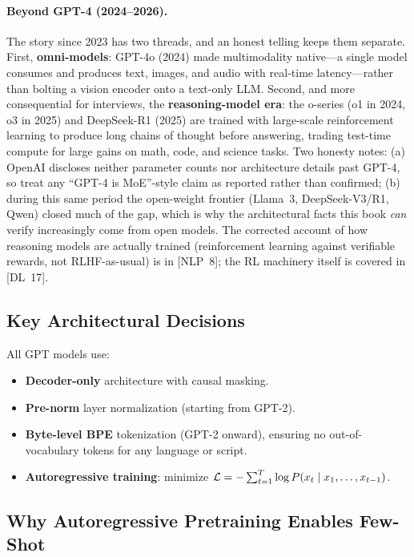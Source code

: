 \paragraph{Beyond GPT-4 (2024--2026).}
The story since 2023 has two threads, and an honest telling keeps them
separate.  First, \textbf{omni-models}: GPT-4o (2024) made multimodality
native---a single model consumes and produces text, images, and audio with
real-time latency---rather than bolting a vision encoder onto a text-only
LLM.  Second, and more consequential for interviews, the
\textbf{reasoning-model era}: the o-series (o1 in 2024, o3 in 2025) and
DeepSeek-R1 (2025) are trained with large-scale reinforcement learning to
produce long chains of thought before answering, trading test-time compute
for large gains on math, code, and science tasks.  Two honesty notes: (a)
OpenAI discloses neither parameter counts nor architecture details past
GPT-4, so treat any ``GPT-4 is MoE''-style claim as reported rather than
confirmed; (b) during this same period the open-weight frontier (Llama~3,
DeepSeek-V3/R1, Qwen) closed much of the gap, which is why the
architectural facts this book \emph{can} verify increasingly come from open
models.  The corrected account of how reasoning models are actually trained
(reinforcement learning against verifiable rewards, not RLHF-as-usual) is
in [NLP~8]; the RL machinery itself is covered in [DL~17].

\subsection{Key Architectural Decisions}

All GPT models use:
\begin{itemize}
    \item \textbf{Decoder-only} architecture with causal masking.
    \item \textbf{Pre-norm} layer normalization (starting from GPT-2).
    \item \textbf{Byte-level BPE} tokenization (GPT-2 onward), ensuring no
          out-of-vocabulary tokens for any language or script.
    \item \textbf{Autoregressive training}: minimize
          $\mathcal{L} = -\sum_{t=1}^{T} \log P(x_t \mid x_1, \ldots, x_{t-1})$.
\end{itemize}

\subsection{Why Autoregressive Pretraining Enables Few-Shot}

